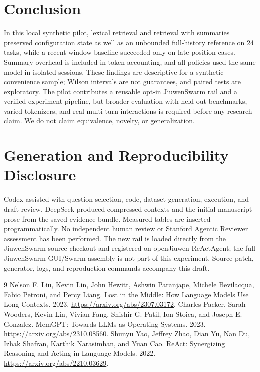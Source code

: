 \documentclass{article}
\begin{document}
\section{Conclusion}
In this local synthetic pilot, lexical retrieval and retrieval with summaries preserved configuration state as well as an unbounded full-history reference on 24 tasks, while a recent-window baseline succeeded only on late-position cases. Summary overhead is included in token accounting, and all policies used the same model in isolated sessions. These findings are descriptive for a synthetic convenience sample; Wilson intervals are not guarantees, and paired tests are exploratory. The pilot contributes a reusable opt-in JiuwenSwarm rail and a verified experiment pipeline, but broader evaluation with held-out benchmarks, varied tokenizers, and real multi-turn interactions is required before any research claim. We do not claim equivalence, novelty, or generalization.
\section{Generation and Reproducibility Disclosure}
Codex assisted with question selection, code, dataset generation, execution, and draft review. DeepSeek produced compressed contexts and the initial manuscript prose from the saved evidence bundle. Measured tables are inserted programmatically. No independent human review or Stanford Agentic Reviewer assessment has been performed. The new rail is loaded directly from the JiuwenSwarm source checkout and registered on openJiuwen ReActAgent; the full JiuwenSwarm GUI/Swarm assembly is not part of this experiment. Source patch, generator, logs, and reproduction commands accompany this draft.
\begin{thebibliography}{9}
 Nelson F. Liu, Kevin Lin, John Hewitt, Ashwin Paranjape, Michele Bevilacqua, Fabio Petroni, and Percy Liang. Lost in the Middle: How Language Models Use Long Contexts. 2023. \url{https://arxiv.org/abs/2307.03172}.
 Charles Packer, Sarah Wooders, Kevin Lin, Vivian Fang, Shishir G. Patil, Ion Stoica, and Joseph E. Gonzalez. MemGPT: Towards LLMs as Operating Systems. 2023. \url{https://arxiv.org/abs/2310.08560}.
 Shunyu Yao, Jeffrey Zhao, Dian Yu, Nan Du, Izhak Shafran, Karthik Narasimhan, and Yuan Cao. ReAct: Synergizing Reasoning and Acting in Language Models. 2022. \url{https://arxiv.org/abs/2210.03629}.
\end{thebibliography}
\end{document}
